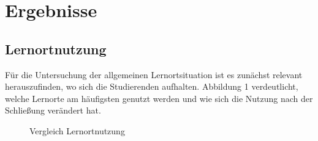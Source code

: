 \documentclass[11pt, a4paper]{article}
\begin{document}
\section{Ergebnisse}
\subsection{Lernortnutzung}
Für die Untersuchung der allgemeinen Lernortsituation ist es zunächst relevant herauszufinden, wo sich die Studierenden aufhalten. Abbildung 1 verdeutlicht, welche Lernorte am häufigsten genutzt werden und wie sich die Nutzung nach der Schließung verändert hat.
\vspace{-0.48cm}
\begin{figure}[h]
 
 \vspace{0.1cm}
 \caption{Vergleich Lernortnutzung}
\end{figure}
\end{document}
